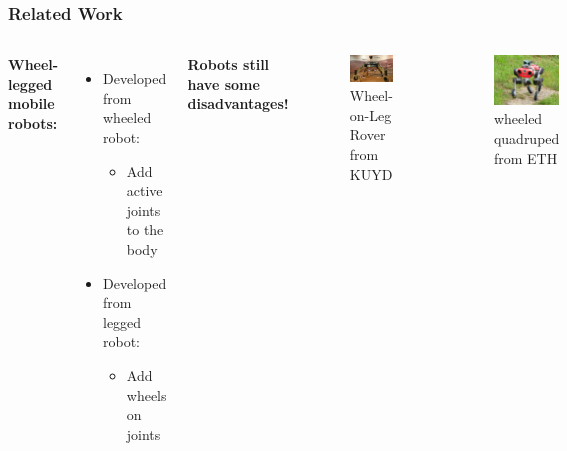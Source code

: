 \begin{frame} %
\frametitle{Related Work}
\begin{columns}
\textbf{Wheel-legged mobile robots:}

\begin{itemize}
    \item Developed from wheeled robot: 
    \begin{itemize} 
        \item Add active joints to the body
    \end{itemize} 
    \item Developed from legged robot: 
    \begin{itemize} 
        \item Add wheels on joints
    \end{itemize} 
\end{itemize} 


\textbf{Robots still have some disadvantages!}

\begin{figure}
    \centering
    \vspace{-1.2cm}
    \includegraphics[width=4cm]{photos/wheel-leg.png} 
    \vspace{-0.3cm}
    \caption{Wheel-on-Leg Rover from KUYD}
    \label{fig:wheel-leg}
    \vspace{-0.3cm}
\end{figure}

\begin{figure}
    \centering
    \includegraphics[width=4cm]{photos/anymal-1.png} 
    \vspace{-0.3cm}
    \caption{wheeled quadruped from ETH}
    \label{fig:anymal-1}
    \vspace{-0.7cm}
\end{figure}
\end{columns}
\end{frame}

